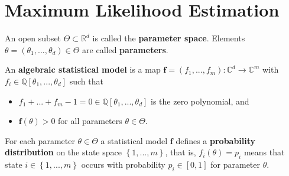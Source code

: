 \documentclass[a4paper, 11pt]{article}
\begin{document}
\maketitle
\tableofcontents







\section{Maximum Likelihood Estimation}

\begin{defi}
  An open subset \( \Theta \subset \mathbb R^d \) is called the \textbf{parameter space}. Elements \( \theta = (\theta_1,...,\theta_d) \in \Theta \) are called \textbf{parameters}.
\end{defi}

\begin{defi}
  An \textbf{algebraic statistical model} is a map \( \mathbf f = (f_1,...,f_m): \mathbb C^d \to \mathbb C^m \) with \(f_i \in \mathbb Q[\theta_1,...,\theta_d] \) such that 
  \begin{itemize}
    \item \( f_1 + ... + f_m - 1 = 0 \in \mathbb Q[\theta_1,...,\theta_d] \) is the zero polynomial, and 
    \item \( \mathbf f(\theta) > 0 \) for all parameters \( \theta \in \Theta \).
  \end{itemize}
  For each parameter \( \theta \in \Theta \) a statistical model \( \mathbf f \) defines a {\textbf{probability distribution}} on the state space \( \left\{ 1,...,m \right\} \), that is, \( f_i(\theta) = p_i \) means that state \( i \in \left\{ 1,...,m \right\} \) occurs with probability \( p_i \in [0,1] \) for parameter \( \theta \).
\end{defi}
\end{document}
